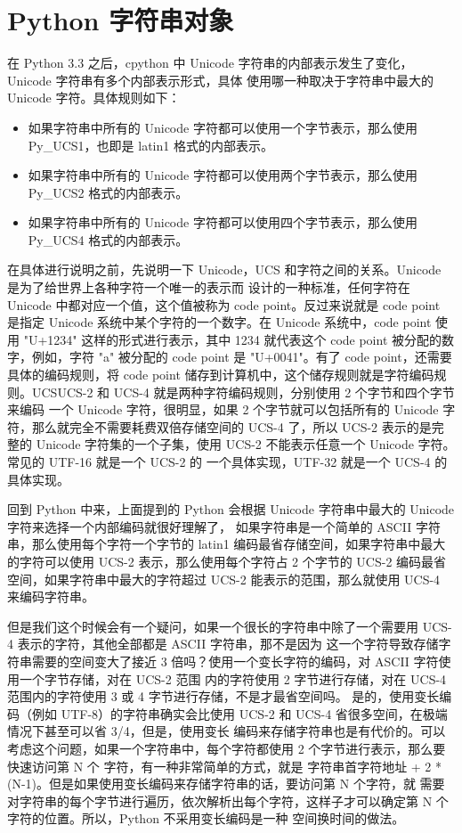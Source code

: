 \chapter{Python 字符串对象}

在 Python 3.3 之后，cpython 中 Unicode 字符串的内部表示发生了变化，Unicode 字符串有多个内部表示形式，具体
使用哪一种取决于字符串中最大的 Unicode 字符。具体规则如下：
\begin{itemize}
\item 如果字符串中所有的 Unicode 字符都可以使用一个字节表示，那么使用 Py\_UCS1，也即是 latin1 格式的内部表示。
\item 如果字符串中所有的 Unicode 字符都可以使用两个字节表示，那么使用 Py\_UCS2 格式的内部表示。
\item 如果字符串中所有的 Unicode 字符都可以使用四个字节表示，那么使用 Py\_UCS4 格式的内部表示。
\end{itemize}

在具体进行说明之前，先说明一下 Unicode，UCS 和字符之间的关系。Unicode 是为了给世界上各种字符一个唯一的表示而
设计的一种标准，任何字符在 Unicode 中都对应一个值，这个值被称为 code point。反过来说就是 code point 是指定 Unicode
系统中某个字符的一个数字。在 Unicode 系统中，code point 使用 "U+1234" 这样的形式进行表示，其中 1234 就代表这个 code
point 被分配的数字，例如，字符 "a" 被分配的 code point 是 "U+0041"。有了 code point，还需要具体的编码规则，将 code point
储存到计算机中，这个储存规则就是字符编码规则。UCSUCS-2 和 UCS-4 就是两种字符编码规则，分别使用 2 个字节和四个字节来编码
一个 Unicode 字符，很明显，如果 2 个字节就可以包括所有的 Unicode 字符，那么就完全不需要耗费双倍存储空间的 UCS-4 了，所以
UCS-2 表示的是完整的 Unicode 字符集的一个子集，使用 UCS-2 不能表示任意一个 Unicode 字符。常见的 UTF-16 就是一个 UCS-2 的
一个具体实现，UTF-32 就是一个 UCS-4 的具体实现。

回到 Python 中来，上面提到的 Python 会根据 Unicode 字符串中最大的 Unicode 字符来选择一个内部编码就很好理解了，
如果字符串是一个简单的 ASCII 字符串，那么使用每个字符一个字节的 latin1 编码最省存储空间，如果字符串中最大的字符可以使用
UCS-2 表示，那么使用每个字符占 2 个字节的 UCS-2 编码最省空间，如果字符串中最大的字符超过 UCS-2 能表示的范围，那么就使用
UCS-4 来编码字符串。

但是我们这个时候会有一个疑问，如果一个很长的字符串中除了一个需要用 UCS-4 表示的字符，其他全部都是 ASCII 字符串，那不是因为
这一个字符导致存储字符串需要的空间变大了接近 3 倍吗？使用一个变长字符的编码，对 ASCII 字符使用一个字节存储，对在 UCS-2 范围
内的字符使用 2 字节进行存储，对在 UCS-4 范围内的字符使用 3 或 4 字节进行存储，不是才最省空间吗。
是的，使用变长编码（例如 UTF-8）的字符串确实会比使用 UCS-2 和 UCS-4 省很多空间，在极端情况下甚至可以省 3/4，但是，使用变长
编码来存储字符串也是有代价的。可以考虑这个问题，如果一个字符串中，每个字符都使用 2 个字节进行表示，那么要快速访问第 N 个
字符，有一种非常简单的方式，就是 字符串首字符地址 + 2 * (N-1)。但是如果使用变长编码来存储字符串的话，要访问第 N 个字符，就
需要对字符串的每个字节进行遍历，依次解析出每个字符，这样子才可以确定第 N 个字符的位置。所以，Python 不采用变长编码是一种
空间换时间的做法。

